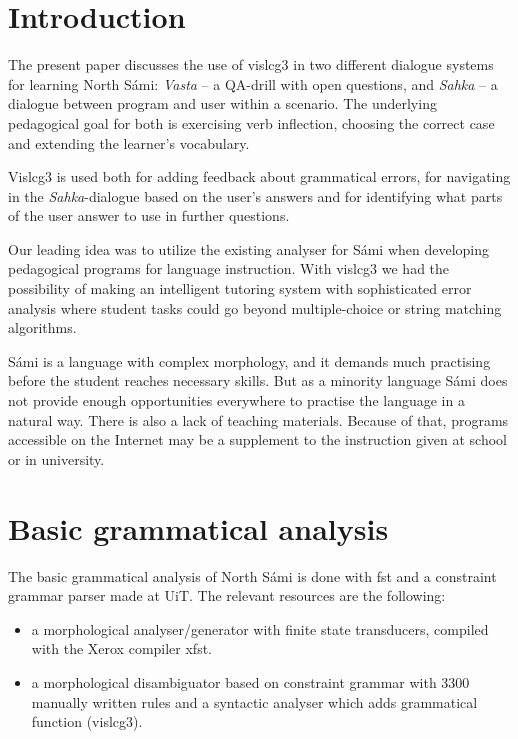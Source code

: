 \documentclass[11pt]{article}
\begin{document}
\section{Introduction} 

The present paper discusses the use of vislcg3 in two different dialogue systems for learning North Sámi: \textit{Vasta} -- a QA-drill with open questions, and \textit{Sahka} -- a  dialogue between program and user within a scenario. The underlying pedagogical goal for both is exercising verb inflection, choosing the correct case and extending the learner's vocabulary. 

Vislcg3 is used both for adding feedback about grammatical errors, for navigating in the \textit{Sahka}-dialogue based on the user's answers and for identifying what parts of the user answer to use in further questions.

Our leading idea was to utilize the existing analyser for Sámi when developing pedagogical programs for language instruction. With vislcg3 we had the possibility of making an intelligent tutoring system with sophisticated error analysis where student tasks could go beyond multiple-choice or string matching algorithms. 

Sámi is a language with complex morphology, and it demands much practising before the student reaches necessary skills. But as a minority language Sámi does not provide enough opportunities everywhere to practise the language in a natural way. There is also a lack of teaching materials. Because of that, programs accessible on the Internet may be a supplement to the instruction given at school or in university. 

\section{Basic grammatical analysis}
The basic grammatical analysis of North Sámi is done with fst and a constraint grammar parser made at UiT. The relevant resources are the following:

\begin{itemize}
\item a morphological analyser/generator with finite state transducers, compiled with the Xerox compiler xfst.  
\item a morphological disambiguator based on constraint grammar with 3300 manually written rules and a syntactic analyser which adds grammatical function (vislcg3). 
\end{itemize}
\end{document}
